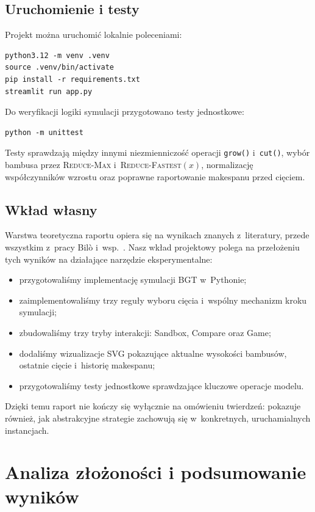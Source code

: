 \documentclass[12pt,a4paper]{article}
\theoremstyle{plain}
\theoremstyle{definition}
\theoremstyle{remark}
\newcommand{\RF}{\textsc{Reduce-Fastest}}
\newcommand{\RM}{\textsc{Reduce-Max}}
\begin{document}
\subsection{Uruchomienie i testy}

Projekt można uruchomić lokalnie poleceniami:
\begin{verbatim}
python3.12 -m venv .venv
source .venv/bin/activate
pip install -r requirements.txt
streamlit run app.py
\end{verbatim}

Do weryfikacji logiki symulacji przygotowano testy jednostkowe:
\begin{verbatim}
python -m unittest
\end{verbatim}

Testy sprawdzają między innymi niezmienniczość operacji \texttt{grow()}
i~\texttt{cut()}, wybór bambusa przez \RM{} i~\RF$(x)$, normalizację
współczynników wzrostu oraz poprawne raportowanie makespanu przed cięciem.

\subsection{Wkład własny}

Warstwa teoretyczna raportu opiera się na wynikach znanych z~literatury,
przede wszystkim z~pracy Bilò i~wsp.~\cite{bilo2022}. Nasz wkład projektowy
polega na przełożeniu tych wyników na działające narzędzie eksperymentalne:
\begin{itemize}[noitemsep]
  \item przygotowaliśmy implementację symulacji BGT w~Pythonie;
  \item zaimplementowaliśmy trzy reguły wyboru cięcia i~wspólny mechanizm
        kroku symulacji;
  \item zbudowaliśmy trzy tryby interakcji: Sandbox, Compare oraz Game;
  \item dodaliśmy wizualizacje SVG pokazujące aktualne wysokości bambusów,
        ostatnie cięcie i~historię makespanu;
  \item przygotowaliśmy testy jednostkowe sprawdzające kluczowe operacje
        modelu.
\end{itemize}

Dzięki temu raport nie kończy się wyłącznie na omówieniu twierdzeń:
pokazuje również, jak abstrakcyjne strategie zachowują się w~konkretnych,
uruchamialnych instancjach.

\section{Analiza złożoności i podsumowanie wyników}
\end{document}
